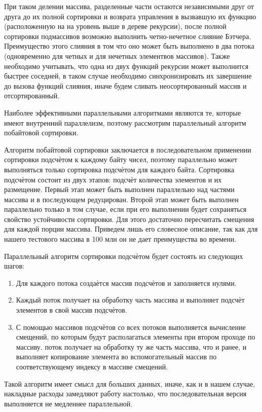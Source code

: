 \documentclass{article}
\begin{document}
\par При таком делении массива, разделенные части остаются независимыми друг от друга до их полной сортировки и возврата управления в вызвавшую их функцию (расположенную на на уровень выше в дереве рекурсии), после полной сортировки подмассивов возможно выполнить четно-нечетное слияние Бэтчера. Преимущество этого слияния в том что оно может быть выполнено в два потока (одновременно для четных и для нечетных элементвов массивов).
Также необходимо учитывать, что одна из двух функций рекурсии может выполнится быстрее соседней, в таком случае необходимо синхронизировать их завершение до вызова функций слияния, иначе будем сливать неосортированный массив и отсортированный.

\par Наиболее эффективными параллельными алгоритмами являются те, которые имеют внутренний параллелизм, поэтому рассмотрим параллельный алгоритм побайтовой сортировки.

\par Алгоритм побайтовой сортировки заключается в последовательном применении сортировки подсчѐтом к каждому байту чисел, поэтому параллельно может выполняться только сортировка подсчѐтом для каждого байта. Сортировка подсчѐтом состоит из двух этапов: подсчѐт количества элементов и их размещение. Первый этап может быть выполнен параллельно над частями массива и в последующем редуцирован. Второй этап может быть выполнен параллельно только в том случае, если при его выполнении будет сохраняться свойство устойчивости сортировки. Для этого достаточно пересчитать смещения для каждой порции массива. Приведем лишь его словесное описание, так как для нашего тестового массива в 100 млн он не дает преимущества во времени.

\par Параллельный алгоритм сортировки подсчѐтом будет состоять из следующих шагов:

\begin{enumerate}
\item Для каждого потока создаѐтся массив подсчѐтов и заполняется нулями. \item Каждый поток получает на обработку часть массива и выполняет подсчѐт элементов в свой массив подсчѐтов.
\item С помощью массивов подсчѐтов со всех потоков выполняется вычисление смещений, по которым будут располагаться элементы при втором проходе по массиву.
 поток получает на обработку ту же часть массива, что и ранее, и выполняет копирование элемента во вспомогательный массив по соответствующему индексу в массиве смещений.
\end{enumerate}
\par Такой алгоритм имеет смысл для больших данных, иначе, как и в нашем случае, накладные расходы замедляют работу настолько, что последовательная версия выполняется не медленнее параллельной.
\end{document}
